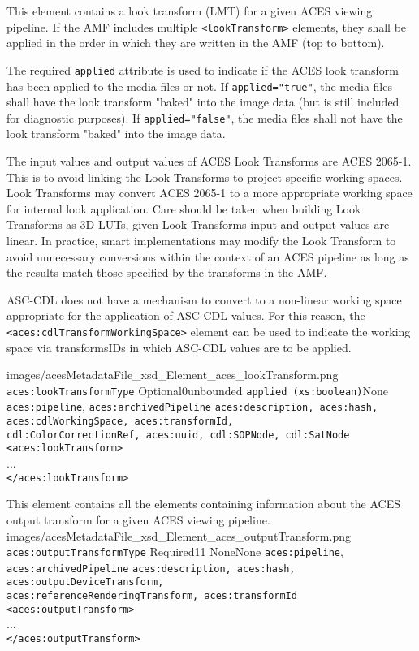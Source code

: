         {This element contains a look transform (LMT) for a given ACES viewing pipeline.  If the AMF includes multiple \texttt{<lookTransform>} elements, they shall be applied in the order in which they are written in the AMF (top to bottom).

        The required \texttt{applied} attribute is used to indicate if the ACES look transform has been applied to the media files or not.  If \texttt{applied="true"}, the media files shall have the look transform "baked" into the image data (but is still included for diagnostic purposes). If \texttt{applied="false"}, the media files shall not have the look transform "baked" into the image data.

        The input values and output values of ACES Look Transforms are ACES 2065-1. This is to avoid linking the Look Transforms to project specific working spaces. Look Transforms may convert ACES 2065-1 to a more appropriate working space for internal look application. Care should be taken when building Look Transforms as 3D LUTs, given Look Transforms input and output values are linear. In practice, smart implementations may modify the Look Transform to avoid unnecessary conversions within the context of an ACES pipeline as long as the results match those specified by the transforms in the AMF.

        ASC-CDL does not have a mechanism to convert to a non-linear working space appropriate for the application of ASC-CDL values. For this reason, the \texttt{<aces:cdlTransformWorkingSpace>} element can be used to indicate the working space via transformsIDs in which ASC-CDL values are to be applied.}
        {images/acesMetadataFile_xsd_Element_aces_lookTransform.png}
        {\texttt{aces:lookTransformType}}
        {Optional}{0}{unbounded}
        {\texttt{applied (xs:boolean)}}{None}
        {\texttt{aces:pipeline}, \texttt{aces:archivedPipeline}}
        {\texttt{aces:description, aces:hash, aces:cdlWorkingSpace, aces:transformId,\\  cdl:ColorCorrectionRef, aces:uuid, cdl:SOPNode, cdl:SatNode}}
        {\lstinline{<aces:lookTransform>} \\
        ... \\
        \lstinline{</aces:lookTransform>}}

        {This element contains all the elements containing information about the ACES output transform for a given ACES viewing pipeline.}
        {images/acesMetadataFile_xsd_Element_aces_outputTransform.png}
        {\texttt{aces:outputTransformType}}
        {Required}{1}{1}
        {None}{None}
        {\texttt{aces:pipeline}, \texttt{aces:archivedPipeline}}
        {\texttt{aces:description, aces:hash, aces:outputDeviceTransform, \\
        aces:referenceRenderingTransform, aces:transformId}}
        {\lstinline{<aces:outputTransform>} \\
        ... \\
        \lstinline{</aces:outputTransform>}}

